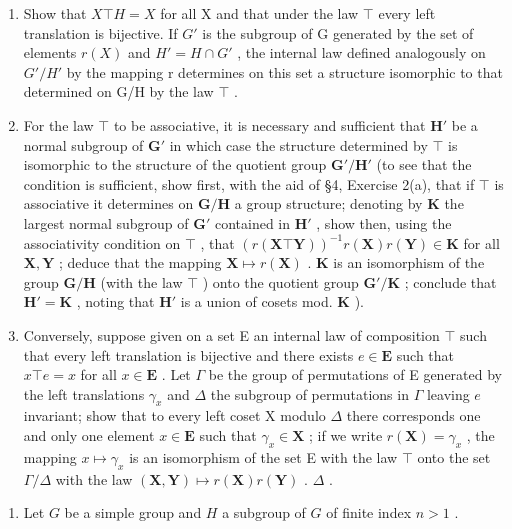 \begin{enumerate}
\def\labelenumi{(\alph{enumi})}
\item
  Show that \(X \top H = X\) for all X and that under the law \(\top\) every left translation is bijective. If \(G'\) is the subgroup of G generated by the set of elements \(r(X)\) and \(H' = H \cap G'\) , the internal law defined analogously on \(G'/H'\) by the mapping r determines on this set a structure isomorphic to that determined on G/H by the law \(\top\) .
\item
  For the law \(\top\) to be associative, it is necessary and sufficient that \(\mathbf{H}'\) be a normal subgroup of \(\mathbf{G}'\) in which case the structure determined by \(\top\) is isomorphic to the structure of the quotient group \(\mathbf{G}' / \mathbf{H}'\) (to see that the condition is sufficient, show first, with the aid of §4, Exercise 2(a), that if \(\top\) is associative it determines on \(\mathbf{G} / \mathbf{H}\) a group structure; denoting by \(\mathbf{K}\) the largest normal subgroup of \(\mathbf{G}'\) contained in \(\mathbf{H}'\) , show then, using the associativity condition on \(\top\) , that \((r(\mathbf{X} \top \mathbf{Y}))^{-1} r(\mathbf{X}) r(\mathbf{Y}) \in \mathbf{K}\) for all \(\mathbf{X}, \mathbf{Y}\) ; deduce that the mapping \(\mathbf{X} \mapsto r(\mathbf{X})\) . \(\mathbf{K}\) is an isomorphism of the group \(\mathbf{G} / \mathbf{H}\) (with the law \(\top\) ) onto the quotient group \(\mathbf{G}' / \mathbf{K}\) ; conclude that \(\mathbf{H}' = \mathbf{K}\) , noting that \(\mathbf{H}'\) is a union of cosets mod. \(\mathbf{K}\) ).
\item
  Conversely, suppose given on a set E an internal law of composition \(\top\) such that every left translation is bijective and there exists \(e \in \mathbf{E}\) such that \(x \top e = x\) for all \(x \in \mathbf{E}\) . Let \(\Gamma\) be the group of permutations of E generated by the left translations \(\gamma_x\) and \(\Delta\) the subgroup of permutations in \(\Gamma\) leaving \(e\) invariant; show that to every left coset X modulo \(\Delta\) there corresponds one and only one element \(x \in \mathbf{E}\) such that \(\gamma_x \in \mathbf{X}\) ; if we write \(r(\mathbf{X}) = \gamma_x\) , the mapping \(x \mapsto \gamma_x\) is an isomorphism of the set E with the law \(\top\) onto the set \(\Gamma / \Delta\) with the law \((\mathbf{X}, \mathbf{Y}) \mapsto r(\mathbf{X})r(\mathbf{Y})\) . \(\Delta\) .
\end{enumerate}

\begin{enumerate}
\def\labelenumi{\arabic{enumi}.}
\setcounter{enumi}{19}
\tightlist
\item
  Let \(G\) be a simple group and \(H\) a subgroup of \(G\) of finite index \(n > 1\) .
\end{enumerate}

